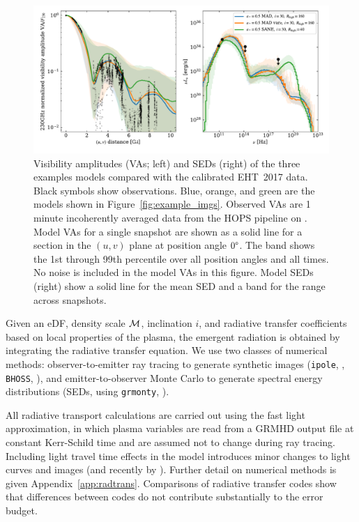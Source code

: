 \begin{figure}
  \centering
  \includegraphics[width=\textwidth]{figures/example_vas_seds.pdf}
  \caption{Visibility amplitudes (VAs; left) and SEDs (right) of the three examples models compared with the calibrated EHT~2017 data.
    Black symbols show observations.
    Blue, orange, and green are the models shown in Figure~\ref{fig:example_imgs}.
    Observed VAs are 1\,minute incoherently averaged data from the HOPS pipeline on \aprilvii.
    Model VAs for a single snapshot are shown as a solid line for a section in the $(u,v)$ plane at position angle $0\degree$. The band shows the 1st through 99th percentile over all position angles and all times.  No noise is included in the model VAs in this figure.
    Model SEDs (right) show a solid line for the mean SED and a band for the range across snapshots.}
  \label{fig:example_vas_seds}
\end{figure}

Given an eDF, density scale $\mathcal{M}$, inclination $i$, and radiative transfer coefficients based on local properties of the plasma, the emergent radiation is obtained by integrating the radiative transfer equation.
We use two classes of numerical methods: observer-to-emitter ray tracing to generate synthetic images ({\tt ipole}, \citealt{2018MNRAS.475...43M}, {\tt BHOSS}, \citealt{2012A&A...545A..13Y}), and emitter-to-observer Monte Carlo to generate spectral energy distributions (SEDs, using {\tt grmonty}, \citealt{2009ApJS..184..387D}).

All radiative transport calculations are carried out using the fast light approximation, in which plasma variables are read from a GRMHD output file at constant Kerr-Schild time and are assumed not to change during ray tracing.
Including light travel time effects in the model introduces minor changes to light curves and images \citet{2010ApJ...717.1092D} (and recently by \citealt{2021MNRAS.508.4282M}).
Further detail on numerical methods is given Appendix~\ref{app:radtrans}.
Comparisons of radiative transfer codes \citep{2020ApJ...897..148G, Prather_et_al_2022} show that differences between codes do not contribute substantially to the error budget.

